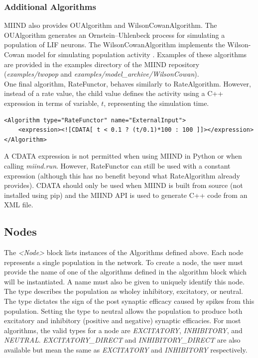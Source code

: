 \documentclass[utf8]{frontiersSCNS} %
\begin{document}
\subsubsection{Additional Algorithms}
MIIND also provides OUAlgorithm and WilsonCowanAlgorithm. The OUAlgorithm generates an Ornstein–Uhlenbeck process \citep{uhlenbeck1930theory} for simulating a population of LIF neurons. The WilsonCowanAlgorithm implements the Wilson-Cowan model for simulating population activity \citep{wilson1972excitatory}. Examples of these algorithms are provided in the examples directory of the MIIND repository (\textit{examples/twopop} and \textit{examples/model\_archive/WilsonCowan}).\\
One final algorithm, RateFunctor, behaves similarly to RateAlgorithm. However, instead of a rate value, the child value defines the activity using a C++ expression in terms of variable, $t$, representing the simulation time.

\begin{lstlisting}[caption={A RateFunctor algorithm definition in which the firing rate linearly increases to 100Hz over 0.1 seconds and remains at 100Hz thereafter.}]
<Algorithm type="RateFunctor" name="ExternalInput">
	<expression><![CDATA[ t < 0.1 ? (t/0.1)*100 : 100 ]]></expression>
</Algorithm>
\end{lstlisting}

A CDATA expression is not permitted when using MIIND in Python or when calling \textit{miind.run}. However, RateFunctor can still be used with a constant expression (although this has no benefit beyond what RateAlgorithm already provides). CDATA should only be used when MIIND is built from source (not installed using pip) and the MIIND API is used to generate C++ code from an XML file.\\

\subsection{Nodes}

The \textit{\textless Node\textgreater} block lists instances of the Algorithms defined above. Each node represents a single population in the network. To create a node, the user must provide the name of one of the algorithms defined in the algorithm block which will be instantiated. A name must also be given to uniquely identify this node. The type describes the population as wholey inhibitory, excitatory, or neutral. The type dictates the sign of the post synaptic efficacy caused by spikes from this population. Setting the type to neutral allows the population to produce both excitatory and inhibitory (positive and negative) synaptic efficacies. For most algorithms, the valid types for a node are \textit{EXCITATORY}, \textit{INHIBITORY}, and \textit{NEUTRAL}. \textit{EXCITATORY\_DIRECT} and \textit{INHIBITORY\_DIRECT} are also available but mean the same as \textit{EXCITATORY} and \textit{INHIBITORY} respectively.
\end{document}
